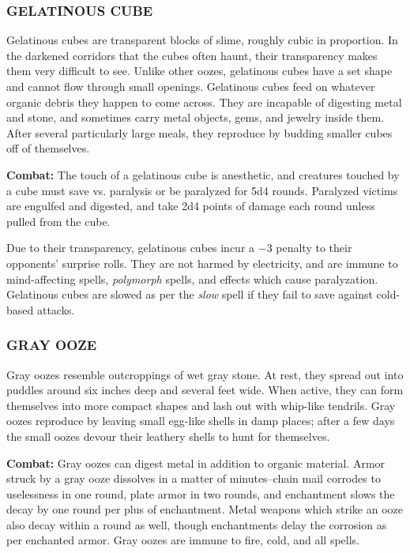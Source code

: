 \begin{multicols}{2}
\subsubsection{GELATINOUS CUBE}

Gelatinous cubes are transparent blocks of slime, roughly cubic in proportion. In the darkened corridors that the cubes often haunt, their transparency makes them very difficult to see. Unlike other oozes, gelatinous cubes have a set shape and cannot flow through small openings. Gelatinous cubes feed on whatever organic debris they happen to come across. They are incapable of digesting metal and stone, and sometimes carry metal objects, gems, and jewelry inside them. After several particularly large meals, they reproduce by budding smaller cubes off of themselves.

\textbf{Combat:} The touch of a gelatinous cube is anesthetic, and creatures touched by a cube must save vs. paralysis or be paralyzed for 5d4 rounds. Paralyzed victims are engulfed and digested, and take 2d4 points of damage each round unless pulled from the cube.

Due to their transparency, gelatinous cubes incur a $-3$ penalty to their opponents' surprise rolls. They are not harmed by electricity, and are immune to mind-affecting spells, \textit{polymorph} spells, and effects which cause paralyzation. Gelatinous cubes are slowed as per the \textit{slow} spell if they fail to save against cold-based attacks.

\subsubsection{GRAY OOZE}

Gray oozes resemble outcroppings of wet gray stone. At rest, they spread out into puddles around six inches deep and several feet wide. When active, they can form themselves into more compact shapes and lash out with whip-like tendrils. Gray oozes reproduce by leaving small egg-like shells in damp places; after a few days the small oozes devour their leathery shells to hunt for themselves.

\textbf{Combat:} Gray oozes can digest metal in addition to organic material. Armor struck by a gray ooze dissolves in a matter of minutes--chain mail corrodes to uselessness in one round, plate armor in two rounds, and enchantment slows the decay by one round per plus of enchantment. Metal weapons which strike an ooze also decay within a round as well, though enchantments delay the corrosion as per enchanted armor. Gray oozes are immune to fire, cold, and all spells.


\end{multicols}
